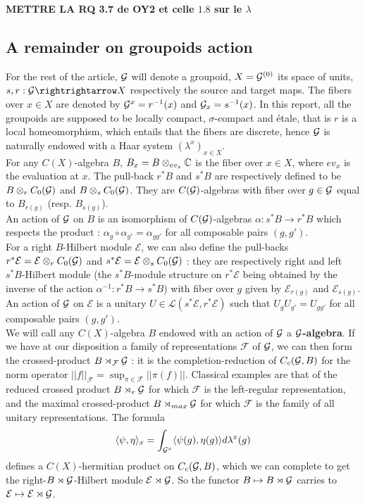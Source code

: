 \textbf{METTRE LA RQ 3.7 de OY2 et celle $1.8$ sur le $\lambda$}

\subsection{A remainder on groupoids action}

For the rest of the article, $\mathcal G$ will denote a groupoid, $X=\mathcal G^{(0)}$ its space of units, $s,r: \G\rightrightarrow X$ respectively the source and target maps. The fibers over $x\in X$ are denoted by $\mathcal G^x = r^{-1}(x)$ and $\mathcal G_x=s^{-1}(x)$. In this report, all the groupoids are supposed to be locally compact, $\sigma$-compact and étale, that is $r$ is a local homeomorphism, which entails that the fibers are discrete, hence $\mathcal G$ is naturally endowed with a Haar system $(\lambda^x)_{x\in X}$.\\
For any $C(X)$-algebra $B$, $B_x = B\otimes_{ev_x} \mathbb C$ is the fiber over $x\in X$, where $ev_x$ is the evaluation at $x$. The pull-back $r^*B$ and $s^*B$ are respectively defined to be $B\otimes_r C_0(\mathcal G) $ and $B\otimes_s C_0(\mathcal G) $. They are $C(\mathcal G)$-algebras with fiber over $g\in \mathcal G$ equal to $B_{r(g)}$ (resp. $B_{s(g)}$).\\
An action of $\mathcal G$ on $B$ is an isomorphism of $C(\mathcal G)$-algebras $\alpha : s^*B\rightarrow r^*B$ which respects the product : $\alpha_g\circ\alpha_{g'}=\alpha_{gg'}$ for all composable pairs $(g,g')$.\\
For a right $B$-Hilbert module $\mathcal E$, we can also define the pull-backs $r^*\mathcal E = \mathcal E\otimes_r C_0(\mathcal G) $ and $s^*\mathcal E = \mathcal E\otimes_s C_0(\mathcal G) $ : they are respectively right and left $s^*B$-Hilbert module (the $s^*B$-module structure on $r^*\mathcal E$ being obtained by the inverse of the action $\alpha^{-1}: r^*B\rightarrow s^*B$) with fiber over $g$ given by $\mathcal E_{r(g)}$ and $\mathcal E_{s(g)}$.\\
An action of $\mathcal G$ on $\mathcal E$ is a unitary $U\in \mathcal L(s^*\mathcal E,r^*\mathcal E) $ such that $U_g U_{g'}=U_{gg'}$ for all composable pairs $(g,g')$.\\
We will call any $C(X)$-algebra $B$ endowed with an action of $\mathcal G$ a \textbf{$\mathcal G$-algebra}. If we have at our disposition a family of representations $\mathcal F$ of $\mathcal G$, we can then form the crossed-product $B\rtimes_{\mathcal F} \mathcal G$ : it is the completion-reduction of $C_c(\mathcal G,B)$ for the norm operator $||f||_{\mathcal F}= \sup_{\pi\in \mathcal F} ||\pi(f)||$. Classical examples are that of the reduced crossed product $B\rtimes_r \mathcal G$ for which $\mathcal F$ is the left-regular representation, and the maximal crossed-product $B\rtimes_{max}\mathcal G$ for which $\mathcal F$ is the family of all unitary representations. 
The formula 
\[\langle \psi, \eta\rangle_x = \int_{\mathcal G^x} \langle \psi(g),\eta(g)\rangle d\lambda^x(g)\] 
defines a $C(X)$-hermitian product on $C_c(\mathcal G,B)$, which we can complete to get the right-$B\rtimes \mathcal G$-Hilbert module $\mathcal E\rtimes \mathcal G$. So the functor $B\mapsto B\rtimes \mathcal G $ carries to $\mathcal E\mapsto \mathcal E\rtimes \mathcal G$. \\

